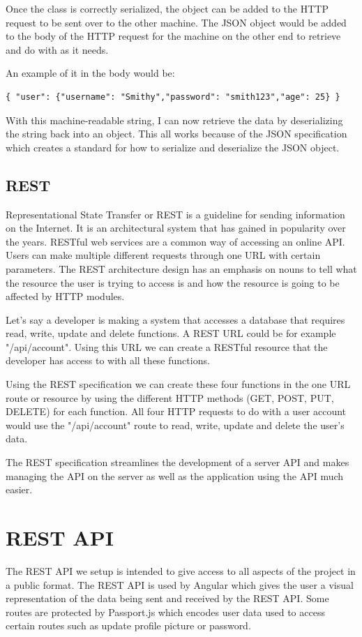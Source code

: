 Once the class is correctly serialized, the object can be added to the HTTP request to be sent over to the other machine. The JSON object would be added to the body of the HTTP request for the machine on the other end to retrieve and do with as it needs.

An example of it in the body would be:
\begin{verbatim}
{ "user": {"username": "Smithy","password": "smith123","age": 25} }
\end{verbatim}

With this machine-readable string, I can now retrieve the data by deserializing the string back into an object. This all works because of the JSON specification which creates a standard for how to serialize and deserialize the JSON object. \cite{65486020130101}

\subsection{REST}
Representational State Transfer or REST is a guideline for sending information on the Internet. It is an architectural system that has gained in popularity over the years. RESTful web services are a common way of accessing an online API. Users can make multiple different requests through one URL with certain parameters. The REST architecture design has an emphasis on nouns to tell what the resource the user is trying to access is and how the resource is going to be affected by HTTP modules. \cite{124257720160101}

Let's say a developer is making a system that accesses a database that requires read, write, update and delete functions. A REST URL could be for example "/api/account". Using this URL we can create a RESTful resource that the developer has access to with all these functions.

Using the REST specification we can create these four functions in the one URL route or resource by using the different HTTP methods (GET, POST, PUT, DELETE) for each function. All four HTTP requests to do with a user account would use the "/api/account" route to read, write, update and delete the user's data.

The REST specification streamlines the development of a server API and makes managing the API on the server as well as the application using the API much easier.

\section{REST API}
The REST API we setup is intended to give access to all aspects of the project in a public format. The REST API is used by Angular which gives the user a visual representation of the data being sent and received by the REST API. Some routes are protected by Passport.js which encodes user data used to access certain routes such as update profile picture or password.

